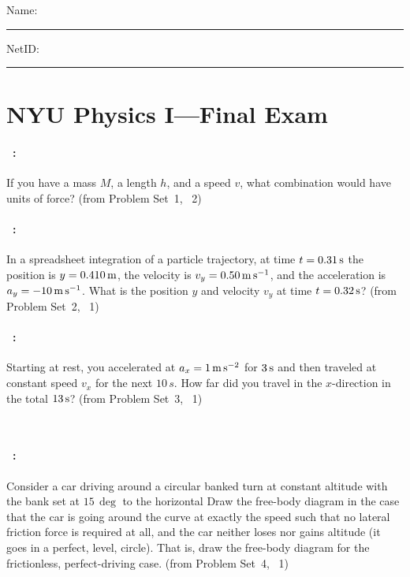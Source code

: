 \documentclass[12pt]{article} 
\begin{document}
\noindent
Name: \rule[-1ex]{0.55\textwidth}{0.1pt}
NetID: \rule[-1ex]{0.2\textwidth}{0.1pt}

\section*{NYU Physics I---Final Exam}

\paragraph{\problemname~\theproblem:}%
If you have a mass $M$, a length $h$, and a speed $v$, what
combination would have units of force?
%
(from Problem Set~1, \problemname~2)

\vfill

\paragraph{\problemname~\theproblem:}%
In a spreadsheet integration of a particle trajectory, at time
$t=0.31\,\mathrm{s}$ the position is $y=0.410\,\mathrm{m}$, the velocity is
$v_y=0.50\,\mathrm{m}\,\mathrm{s}^{-1}$, and the acceleration is $a_y=-10\,\mathrm{m}\,\mathrm{s}^{-1}$. What is the
position $y$ and velocity $v_y$ at time $t=0.32\,\mathrm{s}$?
%
(from Problem Set~2, \problemname~1)

\vfill

\paragraph{\problemname~\theproblem:}%
Starting at rest, you accelerated at $a_x=1\,\mathrm{m}\,\mathrm{s}^{-2}$ for $3\,\mathrm{s}$ and
then traveled at constant speed $v_x$ for the next $10\,s$. How far
did you travel in the $x$-direction in the total $13\,\mathrm{s}$?
%
(from Problem Set~3, \problemname~1)

\vfill
~
\clearpage

\paragraph{\problemname~\theproblem:}%
Consider a car driving around a circular banked turn at constant
altitude with the bank set at $15\,\deg$ to the horizontal Draw the
free-body diagram in the case that the car is going around the curve
at exactly the speed such that no lateral friction force is required
at all, and the car neither loses nor gains altitude (it goes in a
perfect, level, circle). That is, draw the free-body diagram for the
frictionless, perfect-driving case.
%
(from Problem Set~4, \problemname~1)
\end{document}
